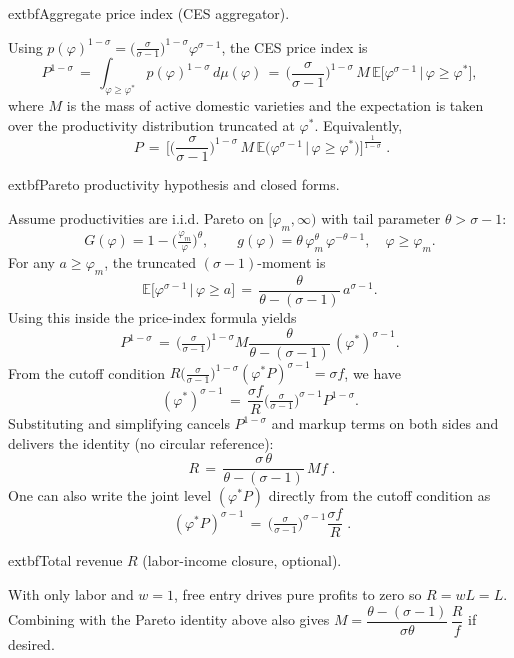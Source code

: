 \begin{solution}
    \bigskip
    		extbf{Aggregate price index (CES aggregator).}
    
    Using $p(\varphi)^{1-\sigma}=\big(\tfrac{\sigma}{\sigma-1}\big)^{1-\sigma} \varphi^{\sigma-1}$, the CES price index is
    \[
        P^{1-\sigma} \,=\, \int_{\varphi\ge \varphi^*} p(\varphi)^{1-\sigma}\, d\mu(\varphi)
        \,=\, \Big(\frac{\sigma}{\sigma-1}\Big)^{1-\sigma}\, M\, \mathbb{E}\big[\varphi^{\sigma-1}\,\big|\,\varphi\ge \varphi^*\big],
    \]
    where $M$ is the mass of active domestic varieties and the expectation is taken over the productivity distribution truncated at $\varphi^*$. Equivalently,
    \[
        \boxed{\;\displaystyle P \,=\, \Big[\Big(\frac{\sigma}{\sigma-1}\Big)^{1-\sigma}\, M\, \mathbb{E}\big(\varphi^{\sigma-1}\,\big|\,\varphi\ge \varphi^*\big)\Big]^{\!\tfrac{1}{1-\sigma}}\; }.
    \]
    
    \bigskip
    	extbf{Pareto productivity hypothesis and closed forms.}

    Assume productivities are i.i.d. Pareto on $[\varphi_m,\infty)$ with tail parameter $\theta>\sigma-1$:
    \[
        G(\varphi)=1-\Big(\tfrac{\varphi_m}{\varphi}\Big)^{\!\theta},\qquad g(\varphi)=\theta\,\varphi_m^{\theta}\,\varphi^{-\theta-1},\quad \varphi\ge\varphi_m.
    \]
    For any $a\ge\varphi_m$, the truncated $(\sigma-1)$-moment is
    \[
        \mathbb{E}\big[\varphi^{\sigma-1}\,\big|\,\varphi\ge a\big] \,=\, \frac{\theta}{\theta-(\sigma-1)}\, a^{\sigma-1}.
    \]
    Using this inside the price-index formula yields
    \[
        P^{1-\sigma} \,=\, \Big(\tfrac{\sigma}{\sigma-1}\Big)^{1-\sigma} M \frac{\theta}{\theta-(\sigma-1)}\, (\varphi^*)^{\sigma-1}.
    \]
    From the cutoff condition $R\Big(\tfrac{\sigma}{\sigma-1}\Big)^{1-\sigma} (\varphi^* P)^{\sigma-1}=\sigma f$, we have
    \[
        (\varphi^*)^{\sigma-1} \,=\, \frac{\sigma f}{R}\Big(\tfrac{\sigma}{\sigma-1}\Big)^{\!\sigma-1} P^{1-\sigma}.
    \]
    Substituting and simplifying cancels $P^{1-\sigma}$ and markup terms on both sides and delivers the identity (no circular reference):
    \[
        \boxed{\; R \,=\, \frac{\sigma\,\theta}{\theta-(\sigma-1)}\, M f \; }.
    \]
    One can also write the joint level $(\varphi^* P)$ directly from the cutoff condition as
    \[
        \boxed{\; (\varphi^* P)^{\sigma-1} \,=\, \Big(\tfrac{\sigma}{\sigma-1}\Big)^{\!\sigma-1} \frac{\sigma f}{R} \; }.
    \]

    \bigskip
    		extbf{Total revenue $R$ (labor-income closure, optional).}

    With only labor and $w=1$, free entry drives pure profits to zero so $R=wL=L$. Combining with the Pareto identity above also gives $M=\dfrac{\theta-(\sigma-1)}{\sigma\theta}\,\dfrac{R}{f}$ if desired.
    

\end{solution}
